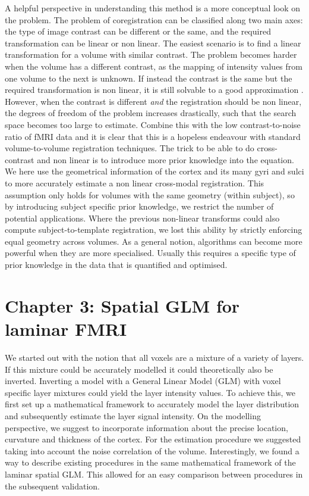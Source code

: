 A helpful perspective in understanding this method is a more conceptual look on the problem. The problem of coregistration can be classified along two main axes: the type of image contrast can be different or the same, and the required transformation can be linear or non linear. The easiest scenario is to find a linear transformation for a volume with similar contrast. The problem becomes harder when the volume has a different contrast, as the mapping of intensity values from one volume to the next is unknown. If instead the contrast is the same but the required transformation is non linear, it is still solvable to a good approximation \cite{Collins1995}. However, when the contrast is different \emph{and} the registration should be non linear, the degrees of freedom of the problem increases drastically, such that the search space becomes too large to estimate. Combine this with the low contrast-to-noise ratio of fMRI data and it is clear that this is a hopeless endeavour with standard volume-to-volume registration techniques. The trick to be able to do cross-contrast and non linear is to introduce more prior knowledge into the equation. We here use the geometrical information of the cortex and its many gyri and sulci to more accurately estimate a non linear cross-modal registration. This assumption only holds for volumes with the same geometry (within subject), so by introducing subject specific prior knowledge, we restrict the number of potential applications. Where the previous non-linear transforms could also compute subject-to-template registration, we lost this ability by strictly enforcing equal geometry across volumes. As a general notion, algorithms can become more powerful when they are more specialised. Usually this requires a specific type of prior knowledge in the data that is quantified and optimised.

\section*{Chapter 3: Spatial GLM for laminar FMRI}
We started out with the notion that all voxels are a mixture of a variety of layers. If this mixture could be accurately modelled it could theoretically also be inverted.
Inverting a model with a General Linear Model (GLM) with voxel specific layer mixtures could yield the layer intensity values. To achieve this, we first set up a mathematical framework to accurately model the layer distribution and subsequently estimate the layer signal intensity. On the modelling perspective, we suggest to incorporate information about the precise location, curvature and thickness of the cortex. For the estimation procedure we suggested taking into account the noise correlation of the volume. Interestingly, we found a way to describe existing procedures in the same mathematical framework of the laminar spatial GLM. This allowed for an easy comparison between procedures in the subsequent validation.

